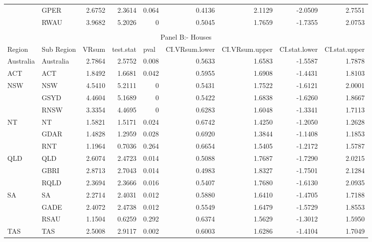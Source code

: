\begin{table}[htbp]
{\begin{tabular}{llrrrrrrr}
          & GPER  & 2.6752 & 2.3614 & 0.064 & 0.4136 & 2.1129 & -2.0509 & 2.7551 \\
          & RWAU  & 3.9682 & 5.2026 & 0     & 0.5045 & 1.7659 & -1.7355 & 2.0753 \\
    \midrule \\
    \multicolumn{9}{c}{Panel B:- Houses} \\
    \midrule
    Region & Sub Region & \multicolumn{1}{l}{ VRsum} & \multicolumn{1}{l}{ test.stat} & \multicolumn{1}{l}{ pval} & \multicolumn{1}{l}{ CI.VRsum.lower} & \multicolumn{1}{l}{ CI.VRsum.upper} & \multicolumn{1}{l}{ CI.stat.lower} & \multicolumn{1}{l}{ CI.stat.upper} \\
    \midrule
    Australia & Australia & 2.7864 & 2.5752 & 0.008 & 0.5633 & 1.6583 & -1.5587 & 1.7878 \\
    ACT   & ACT   & 1.8492 & 1.6681 & 0.042 & 0.5955 & 1.6908 & -1.4431 & 1.8103 \\
    \multirow{3}[0]{*}{NSW} & NSW   & 4.5410 & 5.2111 & 0     & 0.5431 & 1.7522 & -1.6121 & 2.0001 \\
          & GSYD  & 4.4604 & 5.1689 & 0     & 0.5422 & 1.6838 & -1.6260 & 1.8667 \\
          & RNSW  & 3.3354 & 4.4695 & 0     & 0.6283 & 1.6048 & -1.3341 & 1.7113 \\
    \multirow{3}[0]{*}{NT} & NT    & 1.5821 & 1.5171 & 0.024 & 0.6742 & 1.4250 & -1.2050 & 1.2628 \\
          & GDAR  & 1.4828 & 1.2959 & 0.028 & 0.6920 & 1.3844 & -1.1408 & 1.1853 \\
          & RNT   & 1.1964 & 0.7036 & 0.264 & 0.6654 & 1.5405 & -1.2172 & 1.5787 \\
    \multirow{3}[0]{*}{QLD} & QLD   & 2.6074 & 2.4723 & 0.014 & 0.5088 & 1.7687 & -1.7290 & 2.0215 \\
          & GBRI  & 2.8713 & 2.7043 & 0.014 & 0.4983 & 1.8327 & -1.7501 & 2.1284 \\
          & RQLD  & 2.3694 & 2.3666 & 0.016 & 0.5407 & 1.7680 & -1.6130 & 2.0935 \\
    \multirow{3}[0]{*}{SA} & SA    & 2.2714 & 2.4031 & 0.012 & 0.5880 & 1.6410 & -1.4705 & 1.7188 \\
          & GADE  & 2.4072 & 2.4738 & 0.012 & 0.5549 & 1.6479 & -1.5729 & 1.8553 \\
          & RSAU  & 1.1504 & 0.6259 & 0.292 & 0.6374 & 1.5629 & -1.3012 & 1.5950 \\
    \multirow{3}[0]{*}{TAS} & TAS   & 2.5008 & 2.9117 & 0.002 & 0.6003 & 1.6286 & -1.4104 & 1.7049 \\

\end{tabular}}
\end{table}
